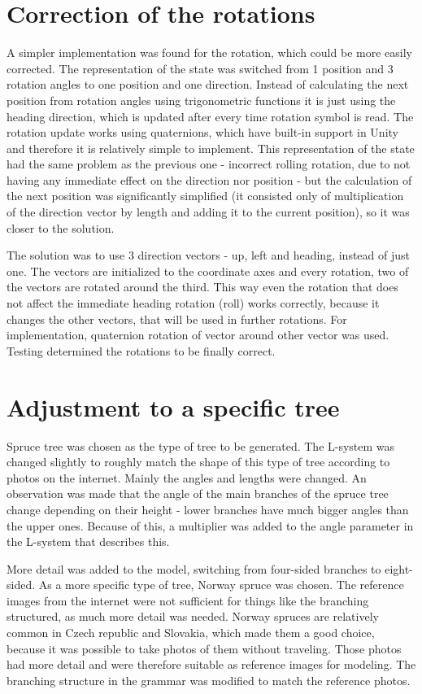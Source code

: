 \documentclass[
  digital, %
  table,   %
  nolof,     %
  nolot,     %
]{fithesis3}
\begin{document}
\section{Correction of the rotations}
A simpler implementation was found for the rotation, which could be more easily corrected. The representation of the state was switched from 1 position and 3 rotation angles to one position and one direction. Instead of calculating the next position from rotation angles using trigonometric functions it is just using the heading direction, which is updated after every time rotation symbol is read. The rotation update works using quaternions, which have built-in support in Unity and therefore it is relatively simple to implement. This representation of the state had the same problem as the previous one - incorrect rolling rotation, due to not having any immediate effect on the direction nor position - but the calculation of the next position was significantly simplified (it consisted only of multiplication of the direction vector by length and adding it to the current position), so it was closer to the solution. \par
The solution was to use 3 direction vectors - up, left and heading, instead of just one. The vectors are initialized to the coordinate axes and every rotation, two of the vectors are rotated around the third. This way even the rotation that does not affect the immediate heading rotation (roll) works correctly, because it changes the other vectors, that will be used in further rotations. For implementation, quaternion rotation of vector around other vector was used. Testing determined the rotations to be finally correct.
\section{Adjustment to a specific tree}
Spruce tree was chosen as the type of tree to be generated. The L-system was changed slightly to roughly match the shape of this type of tree according to photos on the internet. Mainly the angles and lengths were changed. An observation was made that the angle of the main branches of the spruce tree change depending on their height - lower branches have much bigger angles than the upper ones. Because of this, a multiplier was added to the angle parameter in the L-system that describes this. \par
More detail was added to the model, switching from four-sided branches to eight-sided. As a more specific type of tree, Norway spruce was chosen. The reference images from the internet were not sufficient for things like the branching structured, as much more detail was needed. Norway spruces are relatively common in Czech republic and Slovakia, which made them a good choice, because it was possible to take photos of them without traveling. Those photos had more detail and were therefore suitable as reference images for modeling. The branching structure in the grammar was modified to match the reference photos.
\end{document}
